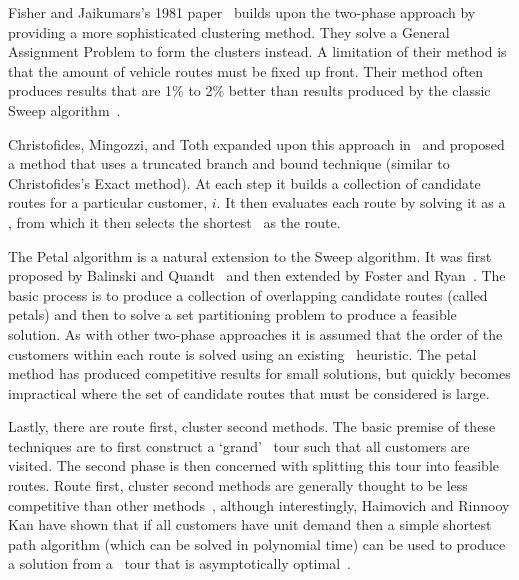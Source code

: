 
Fisher and Jaikumars's 1981 paper~\cite{FJ:1981} builds upon the two-phase approach by providing a more sophisticated clustering method. They solve a General Assignment Problem to form the clusters instead. A limitation of their method is that the amount of vehicle routes must be fixed up front. Their method often produces results that are 1\% to 2\% better than results produced by the classic Sweep algorithm~\cite{TV2001}. 

Christofides, Mingozzi, and Toth expanded upon this approach in~\cite{CMT:1981} and proposed a method that uses a truncated branch and bound technique (similar to Christofides's Exact method). At each step it builds a collection of candidate routes for a particular customer, $i$. It then evaluates each route by solving it as a \TSP, from which it then selects the shortest \TSP\ as the route.

The Petal algorithm is a natural extension to the Sweep algorithm. It was first proposed by Balinski and Quandt~\cite{balinski:64} and then extended by Foster and Ryan~\cite{FR:1976}. The basic process is to produce a collection of overlapping candidate routes (called petals) and then to solve a set partitioning problem to produce a feasible solution. As with other two-phase approaches it is assumed that the order of the customers within each route is solved using an existing \TSP\ heuristic. The petal method has produced competitive results for small solutions, but quickly becomes impractical where the set of candidate routes that must be considered is large.  

Lastly, there are route first, cluster second methods. The basic premise of these techniques are to first construct a `grand' \TSP\ tour such that all customers are visited. The second phase is then concerned with splitting this tour into feasible routes. Route first, cluster second methods are generally thought to be less competitive than other methods~\cite{Laporte:1999}, although interestingly, Haimovich and Rinnooy Kan have shown that if all customers have unit demand then a simple shortest path algorithm (which can be solved in polynomial time) can be used to produce a solution from a \TSP\ tour that is asymptotically optimal~\cite{HK:1985}.

